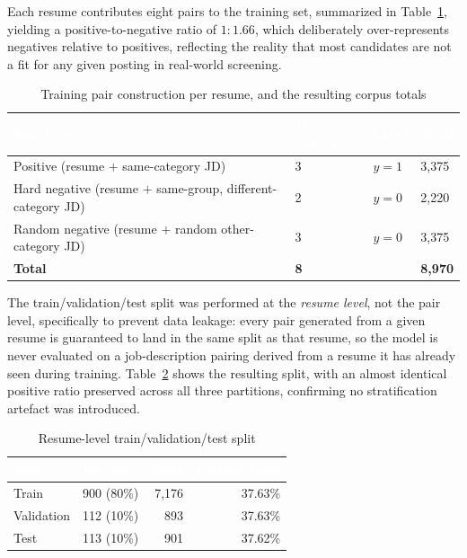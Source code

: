 \documentclass[11pt,a4paper]{article}
\newcommand{\hdrow}{\rowcolor{TPnavy}}
\newcommand{\hdtxt}[1]{\textcolor{white}{\bfseries #1}}
\begin{document}
Each resume contributes eight pairs to the training set, summarized in Table~\ref{tab:mod1-pairconstruction}, yielding a positive-to-negative ratio of $1:1.66$, which deliberately over-represents negatives relative to positives, reflecting the reality that most candidates are not a fit for any given posting in real-world screening.

\begin{table}[H]
\centering
\caption{Training pair construction per resume, and the resulting corpus totals}
\label{tab:mod1-pairconstruction}
\small
\begin{tabular}{p{6.4cm}p{2.0cm}p{1.6cm}p{2.0cm}}
\toprule
\hdrow \hdtxt{Pair type} & \hdtxt{Per resume} & \hdtxt{Label} & \hdtxt{Total} \\
\midrule
Positive (resume $+$ same-category JD) & 3 & $y=1$ & 3{,}375 \\
\rowcolor{TPlight}
Hard negative (resume $+$ same-group, different-category JD) & 2 & $y=0$ & 2{,}220 \\
Random negative (resume $+$ random other-category JD) & 3 & $y=0$ & 3{,}375 \\
\midrule
\textbf{Total} & \textbf{8} & & \textbf{8{,}970} \\
\bottomrule
\end{tabular}
\end{table}

The train/validation/test split was performed at the \emph{resume level}, not the pair level, specifically to prevent data leakage: every pair generated from a given resume is guaranteed to land in the same split as that resume, so the model is never evaluated on a job-description pairing derived from a resume it has already seen during training. Table~\ref{tab:mod1-split} shows the resulting split, with an almost identical positive ratio preserved across all three partitions, confirming no stratification artefact was introduced.

\begin{table}[H]
\centering
\caption{Resume-level train/validation/test split}
\label{tab:mod1-split}
\small
\begin{tabular}{lrrr}
\toprule
\hdrow \hdtxt{Split} & \hdtxt{Resumes} & \hdtxt{Pairs} & \hdtxt{Positive ratio} \\
\midrule
Train & 900 (80\%) & 7{,}176 & 37.63\% \\
\rowcolor{TPlight}
Validation & 112 (10\%) & 893 & 37.63\% \\
Test & 113 (10\%) & 901 & 37.62\% \\
\bottomrule
\end{tabular}
\end{table}
\end{document}
